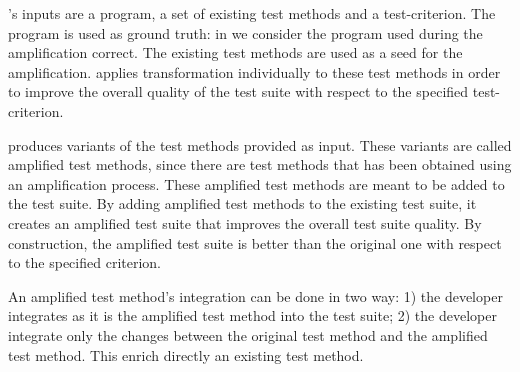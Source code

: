 \dspot's inputs are a program, a set of existing test methods and a test-criterion.
The program is used as ground truth: in \dspot we consider the program used during the amplification correct.
The existing test methods are used as a seed for the amplification.
\dspot applies transformation individually to these test methods in order to improve the overall quality of the test suite with respect to the specified test-criterion.

\dspot produces variants of the test methods provided as input.
These variants are called amplified test methods, since there are test methods that has been obtained using an amplification process.
These amplified test methods are meant to be added to the test suite.
By adding amplified test methods to the existing test suite, it creates an amplified test suite that improves the overall test suite quality.
By construction, the amplified test suite is better than the original one with respect to the specified criterion.

An amplified test method's integration can be done in two way:
1) the developer integrates as it is the amplified test method into the test suite;
2) the developer integrate only the changes between the original test method and the amplified test method.
This enrich directly an existing test method.

